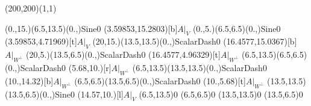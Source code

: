 \unitlength=1bp%

\begin{feynartspicture}(200,200)(1,1)

\FADiagram{}
\FAProp(0.,15.)(6.5,13.5)(0.,){Sine}{0}
\FALabel(3.59853,15.2803)[b]{$A|_V$}
\FAProp(0.,5.)(6.5,6.5)(0.,){Sine}{0}
\FALabel(3.59853,4.71969)[t]{$A|_V$}
\FAProp(20,15.)(13.5,13.5)(0.,){ScalarDash}{0}
\FALabel(16.4577,15.0367)[b]{$A|_{W^\perp}$}
\FAProp(20,5.)(13.5,6.5)(0.,){ScalarDash}{0}
\FALabel(16.4577,4.96329)[t]{$A|_{W^\perp}$}
\FAProp(6.5,13.5)(6.5,6.5)(0.,){ScalarDash}{0}
\FALabel(5.68,10.)[r]{$A|_{W^\perp}$}
\FAProp(6.5,13.5)(13.5,13.5)(0.,){ScalarDash}{0}
\FALabel(10.,14.32)[b]{$A|_{W^\perp}$}
\FAProp(6.5,6.5)(13.5,6.5)(0.,){ScalarDash}{0}
\FALabel(10.,5.68)[t]{$A|_{W^\perp}$}
\FAProp(13.5,13.5)(13.5,6.5)(0.,){Sine}{0}
\FALabel(14.57,10.)[l]{$A|_V$}
\FAVert(6.5,13.5){0}
\FAVert(6.5,6.5){0}
\FAVert(13.5,13.5){0}
\FAVert(13.5,6.5){0}
\end{feynartspicture}

